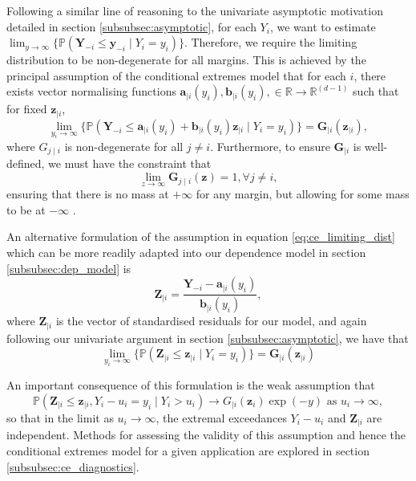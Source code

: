 \documentclass{article}
\numberwithin{equation}{section}
\begin{document}
Following a similar line of reasoning to the univariate asymptotic motivation detailed in section \ref{subsubsec:asymptotic}, for each $Y_i$, we want to estimate $\lim_{y \to \infty}\{\mathbb{P}(\bm{Y}_{-i} \le \bm{y}_{-i} \mid Y_i = y_i)\}$. 
Therefore, we require the limiting distribution to be non-degenerate for all margins.
This is achieved by the principal assumption of the conditional extremes model that for each $i$, there exists vector normalising functions $\bm{a}_{\mid i}(y_i),\bm{b}_{\mid i}(y_i), \in \mathbb{R} \rightarrow \mathbb{R}^{(d-1)}$ such that for fixed $\bm{z}_{\mid i}$,
\begin{equation} \label{eq:ce_limiting_dist}
      \lim_{y_i \rightarrow \infty}\{\mathbb{P}(\bm{Y}_{-i} \le \bm{a}_{\mid i}(y_i) + \bm{b}_{\mid i}(y_i)\bm{z}_{\mid i} \mid Y_i = y_i)\} = \bm{G}_{\mid i}(\bm{z}_{\mid i}),
\end{equation}
where $G_{j \mid i}$ is non-degenerate for all $j \ne i$. 
Furthermore, to ensure $\bm{G}_{\mid i}$ is well-defined, we must have the constraint that 
\[
  \lim_{z \rightarrow \infty}{\bm{G}_{j \mid i}(\bm{z})} = 1, \forall j \ne i,
\]
ensuring that there is no mass at $+\infty$ for any margin, but allowing for some mass to be at $-\infty$ \citep{Keef2013}. 

An alternative formulation of the assumption in equation \ref{eq:ce_limiting_dist} which can be more readily adapted into our dependence model in section \ref{subsubsec:dep_model} is
\begin{equation} \label{eq:standardised_residuals}
  \bm{Z}_{\mid i} = \frac{\bm{Y}_{-i} - \bm{a}_{\mid i}(y_i)} {\bm{b}_{\mid i}(y_i)},
\end{equation}
where $\bm{Z}_{\mid i}$ is the vector of standardised residuals for our model, and again following our univariate argument in section \ref{subsubsec:asymptotic}, we have that
\[
      \lim_{y_i \rightarrow \infty}\{\mathbb{P}(\bm{Z}_{\mid i} \le \bm{z}_{\mid i} \mid Y_i = y_i)\} = \bm{G}_{\mid i}(\bm{z}_{\mid i})
\]

An important consequence of this formulation is the weak assumption that
\begin{equation} \label{eq:limit_independence}
\mathbb{P}(\bm{Z}_{\mid i} \le \bm{z}_{\mid i}, Y_i - u_i = y_i \mid Y_i > u_i) \rightarrow G_{\mid i}(\bm{z}_i) \exp(-y) \text{ as } u_i \rightarrow \infty,
\end{equation}
so that in the limit as $u_i \to \infty$, the extremal exceedances $Y_i - u_i$ and $\bm{Z}_{\mid i}$ are independent.
Methods for assessing the validity of this assumption and hence the conditional extremes model for a given application are explored in section \ref{subsubsec:ce_diagnostics}.
\end{document}
